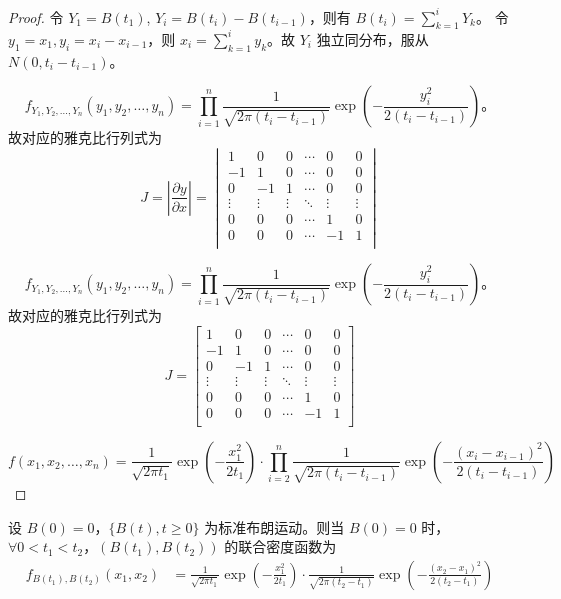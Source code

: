 \documentclass[lang=cn,10pt,thmcnt=section]{elegantbook}
\begin{document}
\begin{proof}
	令 $Y_1 = B(t_1)$, $Y_i = B(t_i) - B(t_{i-1})$，则有 $B(t_i) = \sum_{k=1}^{i} Y_k$。
令 $y_1 = x_1, y_i = x_i - x_{i-1}$，则 $x_i = \sum_{k=1}^{i} y_k$。故 $Y_i$ 独立同分布，服从 $N(0, t_i - t_{i-1})$。

\[
f_{Y_1, Y_2, \ldots, Y_n}(y_1, y_2, \ldots, y_n) = \prod_{i=1}^{n} \frac{1}{\sqrt{2\pi(t_i - t_{i-1})}} \exp\left(-\frac{y_i^2}{2(t_i - t_{i-1})}\right)。
\]
故对应的雅克比行列式为
\[
J = \left| \frac{\partial y}{\partial x} \right| = \begin{vmatrix}
1 & 0 & 0 & \cdots & 0 & 0 \\
-1 & 1 & 0 & \cdots & 0 & 0 \\
0 & -1 & 1 & \cdots & 0 & 0 \\
\vdots & \vdots & \vdots & \ddots & \vdots & \vdots \\
0 & 0 & 0 & \cdots & 1 & 0 \\
0 & 0 & 0 & \cdots & -1 & 1 \\
\end{vmatrix}
\]

\[
f_{Y_1, Y_2, \ldots, Y_n}(y_1, y_2, \ldots, y_n) = \prod_{i=1}^{n} \frac{1}{\sqrt{2\pi(t_i - t_{i-1})}} \exp\left(-\frac{y_i^2}{2(t_i - t_{i-1})}\right)。
\]
故对应的雅克比行列式为
\[
J = \begin{bmatrix}
1 & 0 & 0 & \cdots & 0 & 0 \\
-1 & 1 & 0 & \cdots & 0 & 0 \\
0 & -1 & 1 & \cdots & 0 & 0 \\
\vdots & \vdots & \vdots & \ddots & \vdots & \vdots \\
0 & 0 & 0 & \cdots & 1 & 0 \\
0 & 0 & 0 & \cdots & -1 & 1 \\
\end{bmatrix}
\]

\[
f(x_1, x_2, \ldots, x_n) = \frac{1}{\sqrt{2\pi t_1}} \exp\left(-\frac{x_1^2}{2t_1}\right) \cdot \prod_{i=2}^{n} \frac{1}{\sqrt{2\pi(t_i - t_{i-1})}} \exp\left(-\frac{(x_i - x_{i-1})^2}{2(t_i - t_{i-1})}\right)
\]
\end{proof}

设 $B(0) = 0$，$\{B(t), t \geq 0\}$ 为标准布朗运动。则当 $B(0) = 0$ 时，$\forall 0 < t_1 < t_2$，$(B(t_1), B(t_2))$ 的联合密度函数为
\begin{align*}
f_{B(t_1), B(t_2)}(x_1, x_2) &= \frac{1}{\sqrt{2\pi t_1}} \exp\left(-\frac{x_1^2}{2t_1}\right) \cdot \frac{1}{\sqrt{2\pi(t_2 - t_1)}} \exp\left(-\frac{(x_2 - x_1)^2}{2(t_2 - t_1)}\right)
\end{align*}
\end{document}
